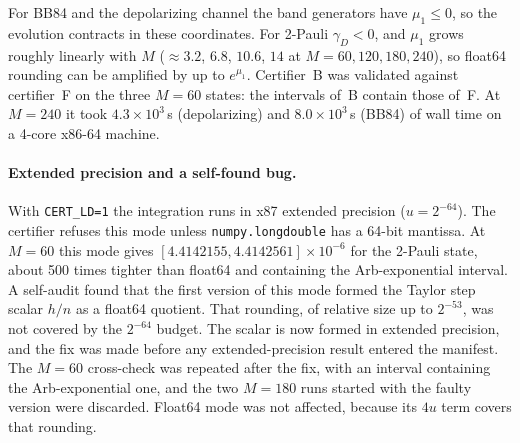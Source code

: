 \documentclass[aps,pra,reprint,superscriptaddress,nofootinbib,longbibliography,floatfix]{revtex4-2}
\theoremstyle{remark}
\begin{document}
For BB84 and the depolarizing channel the band generators have $\mu_1\le0$, so the evolution contracts
in these coordinates. For 2-Pauli $\gamma_D<0$, and $\mu_1$ grows roughly linearly with $M$
($\approx3.2$, $6.8$, $10.6$, $14$ at $M=60,120,180,240$), so float64 rounding can be amplified by up
to $e^{\mu_1}$. Certifier~B was validated against certifier~F on the three $M=60$ states: the
intervals of~B contain those of~F. At $M=240$ it took $4.3\times10^3$\,s (depolarizing) and
$8.0\times10^3$\,s (BB84) of wall time on a 4-core x86-64 machine.

\paragraph*{Extended precision and a self-found bug.} With \texttt{CERT\_LD=1} the integration runs in
x87 extended precision ($u=2^{-64}$). The certifier refuses this mode unless
\texttt{numpy.longdouble} has a 64-bit mantissa. At $M=60$ this mode gives
$[4.4142155,4.4142561]\times10^{-6}$ for the 2-Pauli state, about 500 times tighter than float64 and
containing the Arb-exponential interval. A self-audit found that the first version of this mode formed
the Taylor step scalar $h/n$ as a float64 quotient. That rounding, of relative size up to $2^{-53}$, was
not covered by the $2^{-64}$ budget. The scalar is now formed in extended precision, and the fix was made
before any extended-precision result entered the manifest. The $M=60$ cross-check was repeated after
the fix, with an interval containing the Arb-exponential one, and the two $M=180$ runs started with the
faulty version were discarded. Float64 mode was not affected, because its $4u$ term covers that
rounding.
\end{document}
